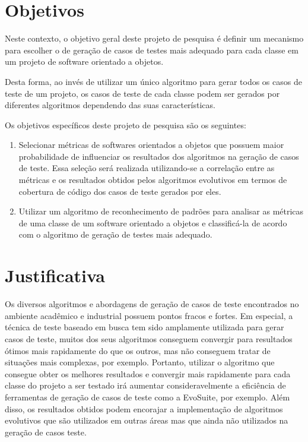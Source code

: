 \documentclass[
	12pt,				%
	oneside,			%
	a4paper,			%
	english,			%
	brazil				%
	]{abntex2ppgsi}
\begin{document}
\section{Objetivos}

Neste contexto, o objetivo geral deste projeto de pesquisa é definir um mecanismo para escolher o de geração de casos de testes mais adequado para cada classe em um projeto de software orientado a objetos. 

Desta forma, ao invés de utilizar um único algoritmo para gerar todos os casos de teste de um projeto, os casos de teste de cada classe podem ser gerados por diferentes algoritmos dependendo das suas características.

Os objetivos específicos deste projeto de pesquisa são os seguintes:

\begin{enumerate}
	\item Selecionar métricas de softwares orientados a objetos que possuem maior probabilidade de influenciar os resultados dos algoritmos na geração de casos de teste. Essa seleção será realizada utilizando-se a correlação entre as métricas e os resultados obtidos pelos algoritmos evolutivos em termos de cobertura de código dos casos de teste gerados por eles.
	\item Utilizar um algoritmo de reconhecimento de padrões para analisar as métricas  de uma classe de um software orientado a objetos e classificá-la de acordo com o algoritmo de geração de testes mais adequado.
\end{enumerate}

\section{Justificativa}
Os diversos algoritmos e abordagens de geração de casos de teste encontrados no ambiente acadêmico e industrial possuem pontos fracos e fortes. Em especial, a técnica de teste baseado em busca tem sido amplamente utilizada para gerar casos de teste, muitos dos seus algoritmos conseguem convergir para resultados  ótimos mais rapidamente do que os outros, mas não conseguem tratar de situações mais complexas, por exemplo. Portanto, utilizar o algoritmo que consegue obter os melhores resultados e convergir mais rapidamente para cada classe do projeto a ser testado irá aumentar consideravelmente a eficiência de ferramentas de geração de casos de teste como a EvoSuite, por exemplo. Além disso, os resultados obtidos podem encorajar a implementação de algoritmos evolutivos que são utilizados em outras áreas mas que ainda não utilizados na geração de casos teste.
\end{document}
